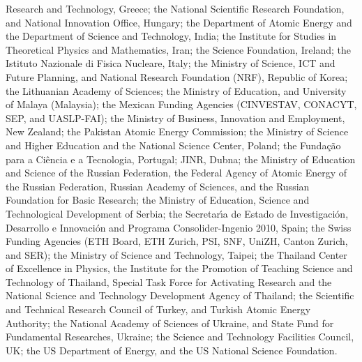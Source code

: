\begin{acknowledgments}
Research and Technology, Greece; the National Scientific Research
Foundation, and National Innovation Office, Hungary; the Department of
Atomic Energy and the Department of Science and Technology, India; the
Institute for Studies in Theoretical Physics and Mathematics, Iran;
the Science Foundation, Ireland; the Istituto Nazionale di Fisica
Nucleare, Italy; the Ministry of Science, ICT and Future Planning, and
National Research Foundation (NRF), Republic of Korea; the Lithuanian
Academy of Sciences; the Ministry of Education, and University of
Malaya (Malaysia); the Mexican Funding Agencies (CINVESTAV, CONACYT,
SEP, and UASLP-FAI); the Ministry of Business, Innovation and
Employment, New Zealand; the Pakistan Atomic Energy Commission; the
Ministry of Science and Higher Education and the National Science
Center, Poland; the Funda\c{c}\~ao para a Ci\^encia e a Tecnologia,
Portugal; JINR, Dubna; the Ministry of Education and Science of the
Russian Federation, the Federal Agency of Atomic Energy of the Russian
Federation, Russian Academy of Sciences, and the Russian Foundation
for Basic Research; the Ministry of Education, Science and
Technological Development of Serbia; the Secretar\'{\i}a de Estado de
Investigaci\'on, Desarrollo e Innovaci\'on and Programa
Consolider-Ingenio 2010, Spain; the Swiss Funding Agencies (ETH Board,
ETH Zurich, PSI, SNF, UniZH, Canton Zurich, and SER); the Ministry of
Science and Technology, Taipei; the Thailand Center of Excellence in
Physics, the Institute for the Promotion of Teaching Science and
Technology of Thailand, Special Task Force for Activating Research and
the National Science and Technology Development Agency of Thailand;
the Scientific and Technical Research Council of Turkey, and Turkish
Atomic Energy Authority; the National Academy of Sciences of Ukraine,
and State Fund for Fundamental Researches, Ukraine; the Science and
Technology Facilities Council, UK; the US Department of Energy, and
the US National Science Foundation.


\end{acknowledgments}
